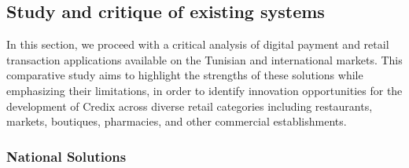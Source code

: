 \subsection{Study and critique of existing systems}

In this section, we proceed with a critical analysis of digital payment and retail transaction applications available on the Tunisian and international markets. This comparative study aims to highlight the strengths of these solutions while emphasizing their limitations, in order to identify innovation opportunities for the development of Credix across diverse retail categories including restaurants, markets, boutiques, pharmacies, and other commercial establishments.

\clearpage
\subsubsection{National Solutions}


